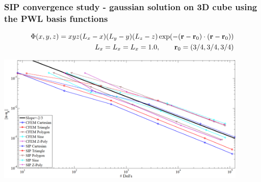 \documentclass[compress,10pt]{beamer}
\begin{document}

\begin{frame}[t]\frametitle{SIP convergence study - gaussian solution on 3D cube using the PWL basis functions}
\begin{block}{}
	\begin{equation*}
		\begin{aligned}
		\Phi(x,y,z) = x y z (L_x - x)  (L_y - y)  (L_z - z) \exp(-({\bf r} - {\bf r}_0) \cdot ({\bf r} - {\bf r}_0))\\
		L_x = L_x = L_x = 1.0 , \qquad {\bf r}_0 = (3/4,3/4,3/4)
		\end{aligned}
	\end{equation*}
\end{block}
\centering
\includegraphics[width=0.9\textwidth]{images/sip_gauss_full_paint.png} 
\end{frame}
\end{document}
